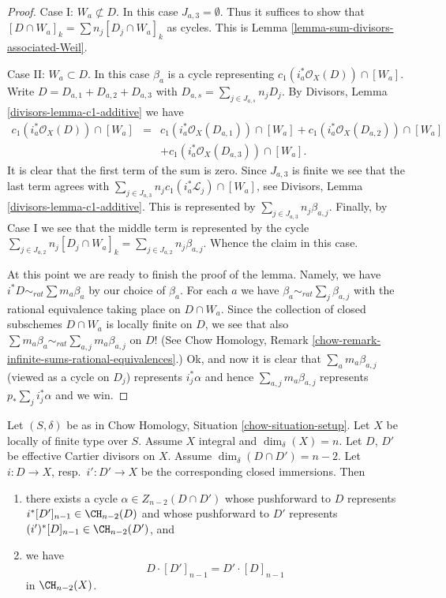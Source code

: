 \begin{proof}
\medskip\noindent
Case I: $W_a \not \subset D$. In this case $J_{a, 3} = \emptyset$.
Thus it suffices to show that
$[D \cap W_a]_k = \sum n_j [D_j \cap W_a]_k$ as cycles.
This is Lemma \ref{lemma-sum-divisors-associated-Weil}.

\medskip\noindent
Case II: $W_a \subset D$. In this case $\beta_a$ is a cycle representing
$c_1(i_a^*\mathcal{O}_X(D)) \cap [W_a]$.
Write $D = D_{a, 1} + D_{a, 2} + D_{a, 3}$ with
$D_{a, s} = \sum_{j \in J_{a, s}} n_jD_j$.
By Divisors, Lemma \ref{divisors-lemma-c1-additive} we have
\begin{eqnarray*}
c_1(i_a^*\mathcal{O}_X(D)) \cap [W_a] & = &
c_1(i_a^*\mathcal{O}_X(D_{a, 1})) \cap [W_a] +
c_1(i_a^*\mathcal{O}_X(D_{a, 2})) \cap [W_a] \\
& &
 + c_1(i_a^*\mathcal{O}_X(D_{a, 3})) \cap [W_a].
\end{eqnarray*}
It is clear that the first term of the sum is zero.
Since $J_{a, 3}$ is finite we see that the last term agrees
with $\sum\nolimits_{j \in J_{a, 3}} n_jc_1(i_a^*\mathcal{L}_j) \cap [W_a]$,
see Divisors, Lemma \ref{divisors-lemma-c1-additive}.
This is represented by $\sum_{j \in J_{a, 3}} n_j \beta_{a, j}$.
Finally, by Case I we see that the middle term is represented by the cycle
$\sum\nolimits_{j \in J_{a, 2}} n_j[D_j \cap W_a]_k =
\sum_{j \in J_{a, 2}} n_j\beta_{a, j}$.
Whence the claim in this case.

\medskip\noindent
At this point we are ready to finish the proof of the lemma.
Namely, we have $i^*D \sim_{rat} \sum m_a\beta_a$ by our
choice of $\beta_a$. For each $a$ we have
$\beta_a \sim_{rat} \sum_j \beta_{a, j}$ with the rational
equivalence taking place on $D \cap W_a$.
Since the collection of closed subschemes $D \cap W_a$
is locally finite on $D$, we see that also
$\sum m_a \beta_a \sim_{rat} \sum_{a, j} m_a\beta_{a, j}$
on $D$! (See
Chow Homology, Remark \ref{chow-remark-infinite-sums-rational-equivalences}.)
Ok, and now it is clear that $\sum_a m_a\beta_{a, j}$ (viewed
as a cycle on $D_j$) represents $i_j^*\alpha$ and hence
$\sum_{a, j} m_a\beta_{a, j}$ represents $p_* \sum_j i_j^*\alpha$
and we win.
\end{proof}

\begin{lemma}
\label{lemma-commutativity-effective-Cartier-proper-intersection}
Let $(S, \delta)$ be as in Chow Homology, Situation \ref{chow-situation-setup}.
Let $X$ be locally of finite type over $S$.
Assume $X$ integral and $\dim_\delta(X) = n$.
Let $D$, $D'$ be effective Cartier divisors on $X$.
Assume $\dim_\delta(D \cap D') = n - 2$. Let $i : D \to X$,
resp.\ $i' : D' \to X$ be the corresponding closed immersions.
Then
\begin{enumerate}
\item there exists a cycle $\alpha \in Z_{n - 2}(D \cap D')$
whose pushforward to $D$ represents
$i^*[D']_{n - 1} \in \CH_{n - 2}(D)$
and whose pushforward to $D'$ represents
$(i')^*[D]_{n - 1} \in \CH_{n - 2}(D')$, and
\item we have
$$
D \cdot [D']_{n - 1}
=
D' \cdot [D]_{n - 1}
$$
in $\CH_{n - 2}(X)$.
\end{enumerate}
\end{lemma}

